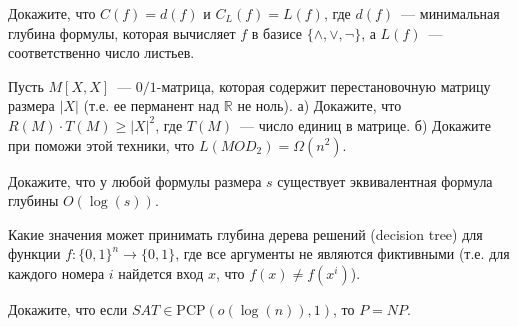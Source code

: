 \begin{task}
    Докажите, что $C(f) = d(f)$ и $C_L(f) = L(f)$, где $d(f)$~--- минимальная глубина формулы, которая вычисляет $f$ в базисе
    $\{\land, \lor, \neg\}$, а $L(f)$~--- соответственно число листьев.
\end{task}

\begin{task}
    Пусть $M[X, X]$~--- $0 / 1$-матрица, которая содержит перестановочную матрицу размера $|X|$ (т.е. ее перманент над
    $\mathbb{R}$ не ноль). а) Докажите, что $R(M) \cdot T(M) \ge |X|^2$, где $T(M)$~--- число единиц в матрице. б) Докажите при
    поможи этой техники, что $L(MOD_2) = \Omega(n^2)$.
\end{task}


\breakline

\begin{ptask}{9}
    Докажите, что у любой формулы размера $s$ существует эквивалентная формула глубины $O(\log(s))$.
\end{ptask}

\begin{ptask}{10}
    Какие значения может принимать глубина дерева решений (decision tree) для функции $f: \{0, 1\}^n \rightarrow \{0, 1\}$, где
    все аргументы не являются фиктивными (т.е. для каждого номера $i$ найдется вход $x$, что $f(x) \neq f(x^{i})$).
\end{ptask}

\begin{ptask}{14}
    Докажите, что если $SAT \in \mathrm{PCP}(o(\log(n)), 1)$, то $P = NP$.
\end{ptask}

